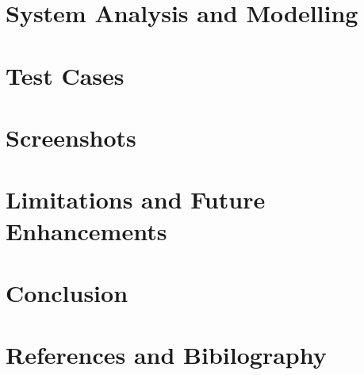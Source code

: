\documentclass[12pt,a4paper]{report}
\begin{document}
\chapter{System Analysis and Modelling}
\newpage
\chapter{Test Cases}
\newpage
\chapter{Screenshots}
\newpage
\chapter{Limitations and Future Enhancements}
\newpage
\chapter{Conclusion}
\newpage
\chapter{References and Bibilography}
\end{document}
